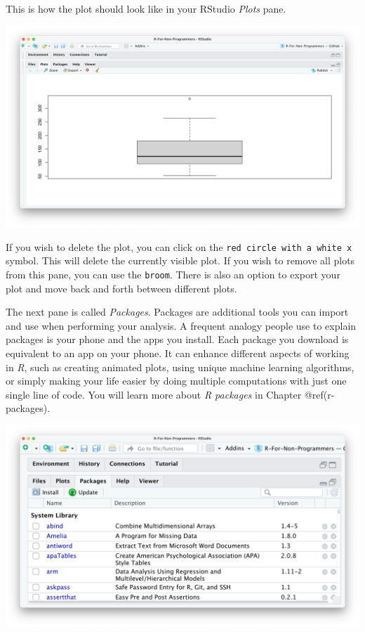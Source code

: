 \documentclass[
  letterpaper,
]{krantz}
\begin{document}
This is how the plot should look like in your RStudio \emph{Plots} pane.

\includegraphics{images/chapter_04_img/05_files_plots_etc/02_rstudio_plots.png}

If you wish to delete the plot, you can click on the
\texttt{red\ circle\ with\ a\ white\ x} symbol. This will delete the
currently visible plot. If you wish to remove all plots from this pane,
you can use the \texttt{broom}. There is also an option to export your
plot and move back and forth between different plots.

The next pane is called \emph{Packages}. Packages are additional tools
you can import and use when performing your analysis. A frequent analogy
people use to explain packages is your phone and the apps you install.
Each package you download is equivalent to an app on your phone. It can
enhance different aspects of working in \emph{R}, such as creating
animated plots, using unique machine learning algorithms, or simply
making your life easier by doing multiple computations with just one
single line of code. You will learn more about \emph{R packages} in
Chapter @ref(r-packages).

\includegraphics{images/chapter_04_img/05_files_plots_etc/03_rstudio_packages.png}
\end{document}
